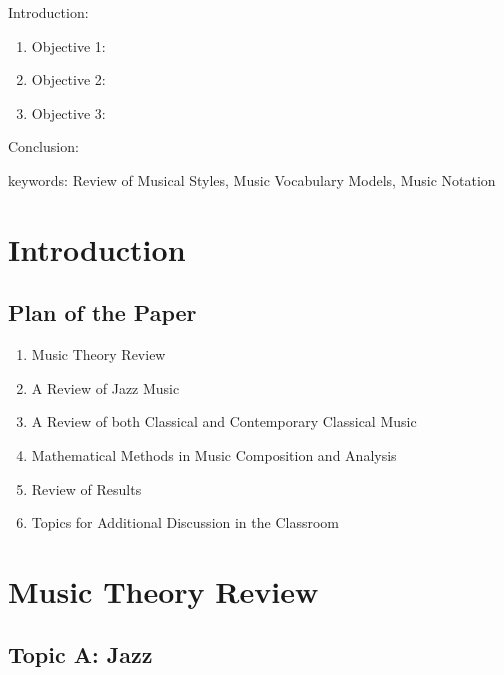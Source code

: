 


\twocolumn
\scriptsize
\begin{frontmatter}
		\title{}
		\author{}
		\address{The Mathematical Learning Space}
\end{frontmatter}	

Introduction:
\begin{enumerate}
\item Objective 1:
\item Objective 2:
\item Objective 3:
\end{enumerate}
Conclusion:

keywords: Review of Musical Styles, Music Vocabulary Models, Music Notation


\section{Introduction}

\subsection{Plan of the Paper}

\begin{enumerate}
\item Music Theory  Review
\item A Review of Jazz Music
\item A Review of both Classical and Contemporary Classical Music
\item Mathematical Methods in Music Composition and Analysis
\item Review of Results
\item Topics for Additional Discussion in the Classroom
\end{enumerate}

\section{Music Theory Review}

\subsection{Topic A: Jazz}

